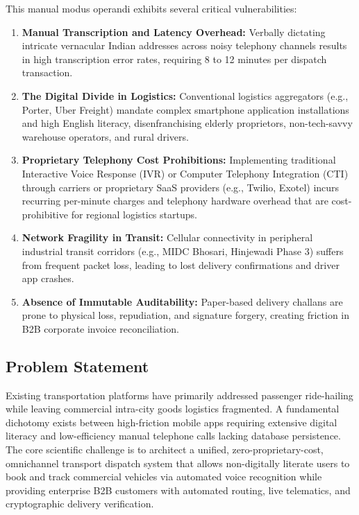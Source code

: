 \documentclass[conference]{IEEEtran}
\begin{document}
This manual modus operandi exhibits several critical vulnerabilities:
\begin{enumerate}
    \item \textbf{Manual Transcription and Latency Overhead:} Verbally dictating intricate vernacular Indian addresses across noisy telephony channels results in high transcription error rates, requiring 8 to 12 minutes per dispatch transaction.
    \item \textbf{The Digital Divide in Logistics:} Conventional logistics aggregators (e.g., Porter, Uber Freight) mandate complex smartphone application installations and high English literacy, disenfranchising elderly proprietors, non-tech-savvy warehouse operators, and rural drivers.
    \item \textbf{Proprietary Telephony Cost Prohibitions:} Implementing traditional Interactive Voice Response (IVR) or Computer Telephony Integration (CTI) through carriers or proprietary SaaS providers (e.g., Twilio, Exotel) incurs recurring per-minute charges and telephony hardware overhead that are cost-prohibitive for regional logistics startups.
    \item \textbf{Network Fragility in Transit:} Cellular connectivity in peripheral industrial transit corridors (e.g., MIDC Bhosari, Hinjewadi Phase 3) suffers from frequent packet loss, leading to lost delivery confirmations and driver app crashes.
    \item \textbf{Absence of Immutable Auditability:} Paper-based delivery challans are prone to physical loss, repudiation, and signature forgery, creating friction in B2B corporate invoice reconciliation.
\end{enumerate}

\subsection{Problem Statement}
Existing transportation platforms have primarily addressed passenger ride-hailing while leaving commercial intra-city goods logistics fragmented. A fundamental dichotomy exists between high-friction mobile apps requiring extensive digital literacy and low-efficiency manual telephone calls lacking database persistence. The core scientific challenge is to architect a unified, zero-proprietary-cost, omnichannel transport dispatch system that allows non-digitally literate users to book and track commercial vehicles via automated voice recognition while providing enterprise B2B customers with automated routing, live telematics, and cryptographic delivery verification.
\end{document}
